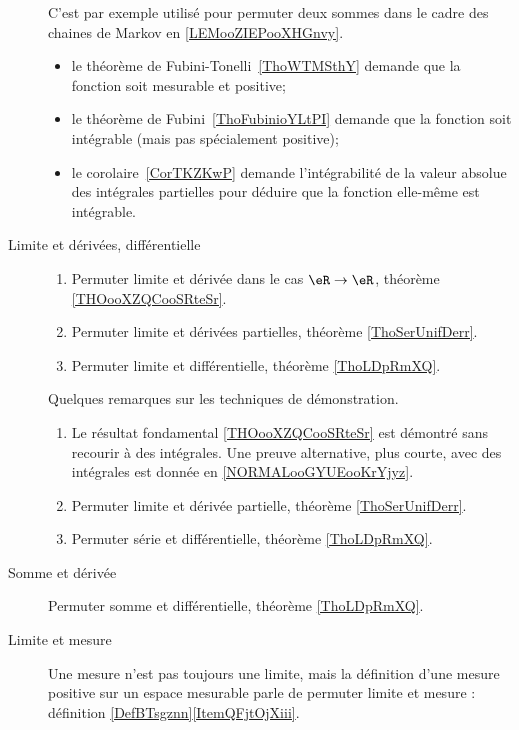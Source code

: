 \begin{description}
        C'est par exemple utilisé pour permuter deux sommes dans le cadre des chaines de Markov en \ref{LEMooZIEPooXHGnvy}.
\begin{itemize}
    \item
        le théorème de Fubini-Tonelli~\ref{ThoWTMSthY} demande que la fonction soit mesurable et positive;
    \item
        le théorème de Fubini~\ref{ThoFubinioYLtPI} demande que la fonction soit intégrable (mais pas spécialement positive);
    \item
        le corolaire~\ref{CorTKZKwP} demande l'intégrabilité de la valeur absolue des intégrales partielles pour déduire que la fonction elle-même est intégrable.
\end{itemize}

\item[Limite et dérivées, différentielle]
    \begin{enumerate}
        \item
            Permuter limite et dérivée dans le cas \( \eR\to \eR\), théorème \ref{THOooXZQCooSRteSr}.
        \item
 Permuter limite et dérivées partielles, théorème \ref{ThoSerUnifDerr}.
        \item
            Permuter limite et différentielle, théorème \ref{ThoLDpRmXQ}.
    \end{enumerate}
    Quelques remarques sur les techniques de démonstration.
    \begin{enumerate}
        \item
            Le résultat fondamental \ref{THOooXZQCooSRteSr} est démontré sans recourir à des intégrales. Une preuve alternative, plus courte, avec des intégrales est donnée en \ref{NORMALooGYUEooKrYjyz}.
        \item
            Permuter limite et dérivée partielle, théorème \ref{ThoSerUnifDerr}.
        \item
            Permuter série et différentielle, théorème \ref{ThoLDpRmXQ}.
    \end{enumerate}
\item[Somme et dérivée]
    Permuter somme et différentielle, théorème \ref{ThoLDpRmXQ}.
\item[Limite et mesure]
    Une mesure n'est pas toujours une limite, mais la définition d'une mesure positive sur un espace mesurable parle de permuter limite et mesure : définition \ref{DefBTsgznn}\ref{ItemQFjtOjXiii}.
\end{description}


